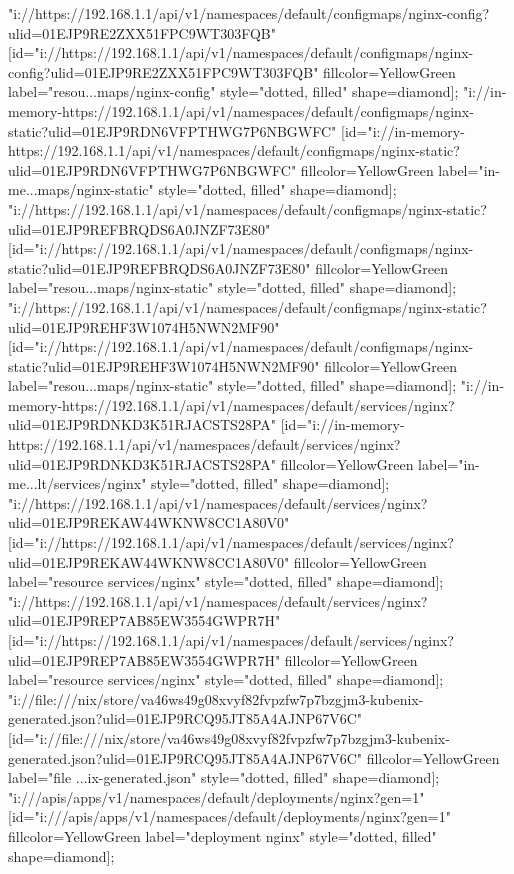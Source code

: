 {"i://https://192.168.1.1/api/v1/namespaces/default/configmaps/nginx-config?ulid=01EJP9RE2ZXX51FPC9WT303FQB" [id="i://https://192.168.1.1/api/v1/namespaces/default/configmaps/nginx-config?ulid=01EJP9RE2ZXX51FPC9WT303FQB" fillcolor=YellowGreen label="resou...maps/nginx-config" style="dotted, filled" shape=diamond];
"i://in-memory-https://192.168.1.1/api/v1/namespaces/default/configmaps/nginx-static?ulid=01EJP9RDN6VFPTHWG7P6NBGWFC" [id="i://in-memory-https://192.168.1.1/api/v1/namespaces/default/configmaps/nginx-static?ulid=01EJP9RDN6VFPTHWG7P6NBGWFC" fillcolor=YellowGreen label="in-me...maps/nginx-static" style="dotted, filled" shape=diamond];
"i://https://192.168.1.1/api/v1/namespaces/default/configmaps/nginx-static?ulid=01EJP9REFBRQDS6A0JNZF73E80" [id="i://https://192.168.1.1/api/v1/namespaces/default/configmaps/nginx-static?ulid=01EJP9REFBRQDS6A0JNZF73E80" fillcolor=YellowGreen label="resou...maps/nginx-static" style="dotted, filled" shape=diamond];
"i://https://192.168.1.1/api/v1/namespaces/default/configmaps/nginx-static?ulid=01EJP9REHF3W1074H5NWN2MF90" [id="i://https://192.168.1.1/api/v1/namespaces/default/configmaps/nginx-static?ulid=01EJP9REHF3W1074H5NWN2MF90" fillcolor=YellowGreen label="resou...maps/nginx-static" style="dotted, filled" shape=diamond];
"i://in-memory-https://192.168.1.1/api/v1/namespaces/default/services/nginx?ulid=01EJP9RDNKD3K51RJACSTS28PA" [id="i://in-memory-https://192.168.1.1/api/v1/namespaces/default/services/nginx?ulid=01EJP9RDNKD3K51RJACSTS28PA" fillcolor=YellowGreen label="in-me...lt/services/nginx" style="dotted, filled" shape=diamond];
"i://https://192.168.1.1/api/v1/namespaces/default/services/nginx?ulid=01EJP9REKAW44WKNW8CC1A80V0" [id="i://https://192.168.1.1/api/v1/namespaces/default/services/nginx?ulid=01EJP9REKAW44WKNW8CC1A80V0" fillcolor=YellowGreen label="resource services/nginx" style="dotted, filled" shape=diamond];
"i://https://192.168.1.1/api/v1/namespaces/default/services/nginx?ulid=01EJP9REP7AB85EW3554GWPR7H" [id="i://https://192.168.1.1/api/v1/namespaces/default/services/nginx?ulid=01EJP9REP7AB85EW3554GWPR7H" fillcolor=YellowGreen label="resource services/nginx" style="dotted, filled" shape=diamond];
"i://file:///nix/store/va46ws49g08xvyf82fvpzfw7p7bzgjm3-kubenix-generated.json?ulid=01EJP9RCQ95JT85A4AJNP67V6C" [id="i://file:///nix/store/va46ws49g08xvyf82fvpzfw7p7bzgjm3-kubenix-generated.json?ulid=01EJP9RCQ95JT85A4AJNP67V6C" fillcolor=YellowGreen label="file ...ix-generated.json" style="dotted, filled" shape=diamond];
"i:///apis/apps/v1/namespaces/default/deployments/nginx?gen=1" [id="i:///apis/apps/v1/namespaces/default/deployments/nginx?gen=1" fillcolor=YellowGreen label="deployment nginx" style="dotted, filled" shape=diamond];
}
